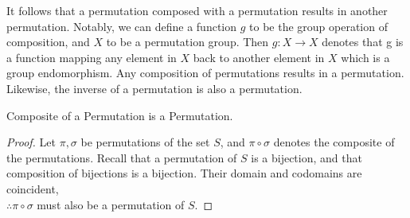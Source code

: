 \documentclass{rhumj_new}
\begin{document}
It follows that a permutation composed with a permutation results in another permutation.
Notably, we can define a function $g$ to be the group operation of composition, and $X$ to be a
permutation group. Then $g:X\rightarrow X$ denotes that g is a function mapping any element in $X$
back to another element in $X$ which is a group endomorphism. Any composition of permutations
results in a permutation. Likewise, the inverse of a permutation is also a permutation.

\begin{thm} Composite of a Permutation is a Permutation.
\end{thm}\label{thmcomp}

\begin{proof}
  Let $\pi,\sigma$ be permutations of the set $S$, and $\pi\circ\sigma$ denotes the composite of
    the permutations. Recall that a permutation of $S$ is a bijection, and that composition of
    bijections is a bijection. Their domain and codomains are coincident,\\ $\therefore
      \pi\circ\sigma$
    must also be a permutation of $S$.
\end{proof}



\end{document}
